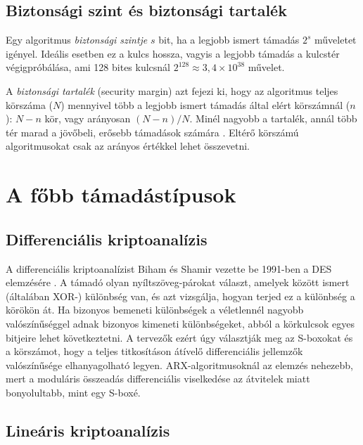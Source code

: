 \documentclass[a4paper,12pt]{report}
\theoremstyle{definition}
\theoremstyle{remark}
\begin{document}
\subsection{Biztonsági szint és biztonsági tartalék}

Egy algoritmus \emph{biztonsági szintje} $s$ bit, ha a legjobb ismert támadás $2^s$ műveletet igényel. Ideális esetben ez a kulcs hossza, vagyis a legjobb támadás a kulcstér végigpróbálása, ami 128 bites kulcsnál $2^{128} \approx 3{,}4 \times 10^{38}$ művelet.

A \emph{biztonsági tartalék} (security margin) azt fejezi ki, hogy az algoritmus teljes körszáma ($N$) mennyivel több a legjobb ismert támadás által elért körszámnál ($n$): $N - n$ kör, vagy arányosan $(N-n)/N$. Minél nagyobb a tartalék, annál több tér marad a jövőbeli, erősebb támadások számára \cite{Biryukov2017}. Eltérő körszámú algoritmusokat csak az arányos értékkel lehet összevetni.

\section{A főbb támadástípusok}\label{sec:tamadastipusok}

\subsection{Differenciális kriptoanalízis}

A differenciális kriptoanalízist Biham és Shamir vezette be 1991-ben a DES elemzésére \cite{Biham1991}. A támadó olyan nyíltszöveg-párokat választ, amelyek között ismert (általában XOR-) különbség van, és azt vizsgálja, hogyan terjed ez a különbség a körökön át. Ha bizonyos bemeneti különbségek a véletlennél nagyobb valószínűséggel adnak bizonyos kimeneti különbségeket, abból a körkulcsok egyes bitjeire lehet következtetni. A tervezők ezért úgy választják meg az S-boxokat és a körszámot, hogy a teljes titkosításon átívelő differenciális jellemzők valószínűsége elhanyagolható legyen. ARX-algoritmusoknál az elemzés nehezebb, mert a moduláris összeadás differenciális viselkedése az átvitelek miatt bonyolultabb, mint egy S-boxé.

\subsection{Lineáris kriptoanalízis}
\end{document}
